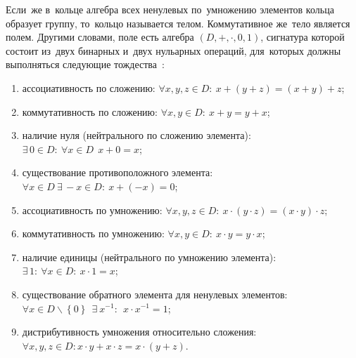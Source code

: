 Если~же в~кольце алгебра всех ненулевых по~умножению элементов кольца образует группу, то~кольцо называется телом. Коммутативное же~тело является полем. Другими словами, поле есть алгебра $\left( D,+,\cdot ,0,1 \right)$, сигнатура которой состоит из~двух бинарных и~двух нульарных операций, для~которых должны выполняться следующие тождества~\cite{Adelson_Velskiy, Bauman_DM, Yakhyaeva}:
\begin{enumerate}
	\item ассоциативность по сложению: $\forall x,y,z\in D:\ x+\left( y+z \right)=\left( x+y \right)+z$;
	\item коммутативность по сложению: $\forall x,y\in D:\ x+y=y+x$;
	\item наличие нуля (нейтрального по сложению элемента): $\exists \,0\in D:\ \forall x\in D\ \ x+0=x$;
	\item существование противоположного элемента:$\forall x\in D\ \exists \,-x\in D:\ x+\left( -x \right)=0$;
	\item ассоциативность по умножению: $\forall x,y,z\in D:\ x\cdot \left( y\cdot z \right)=\left( x\cdot y \right)\cdot z$;
	\item коммутативность по умножению: $\forall x,y\in D:\ x\cdot y=y\cdot x$;
	\item наличие единицы (нейтрального по умножению элемента): $\exists \,1:\ \forall x\in D:\ x\cdot 1=x$;
	\item существование обратного элемента для ненулевых элементов: $\forall x\in D\backslash \left\{ 0 \right\}\ \ \exists \ {{x}^{-1}}:\ \ x\cdot {{x}^{-1}}=1$;
	\item дистрибутивность умножения относительно сложения: $\forall x,y,z\in D:x\cdot y+x\cdot z=x\cdot \left( y+z \right)$.
\end{enumerate}

